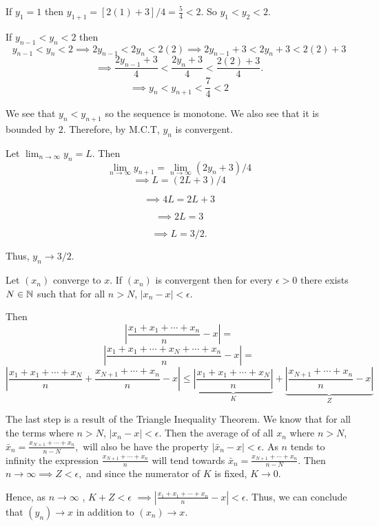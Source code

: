\documentclass{report}
\begin{document}
\begin{myproof}

  If $y_1 = 1$ then $y_{1+1} =  [2(1) +3]/4 = \frac{5}{4} < 2.$ So $y_1 < y_2 < 2.$
    
  If $y_{n-1}<y_n<2$ then $$y_{n-1}<y_{n}<2 \implies 2y_{n-1}<2y_{n}<2(2)\implies 2y_{n-1} + 3<2y_{n} +3 <2(2) +3  $$
 $$ \implies \frac{2y_{n-1} + 3}{4}<\frac{2y_{n} +3}{4} <\frac{2(2) +3}{4}. $$
 $$ \implies y_{n} <y_{n+1} <\frac{7}{4} < 2$$

We see that $y_n < y_{n+1}$ so the sequence is monotone. We also see that it is bounded by $2.$  Therefore, by M.C.T, $y_n$ is convergent.
\par
Let $\lim_{n \rightarrow \infty} y_{n} = L$. Then $$\lim_{n \rightarrow \infty} y_{n+1} = \lim_{n \rightarrow \infty}\left(2 y_n+3\right) / 4$$ 
$$\implies L = \left(2 L+3\right) / 4$$ 

$$\implies 4L = 2 L+3$$ 

$$\implies 2L = 3$$ 

$$\implies L = 3/2.$$ 

Thus, ${y_n} \rightarrow 3/2.$
\end{myproof}
\pagebreak

\bigskip
\begin{myproof}
    
  Let $(x_n)$ converge to $x$. If $(x_n)$ is convergent then for every $\epsilon >0$ there exists $N \in \NN$ such that for all $n > N$, $| x_{n} - x| < \epsilon.$

  Then $$ \left| \frac{x_1 + x_1 +\cdots + x_{n} }{n}  - x\right|= $$$$ \left| \frac{x_1 + x_1 + \cdots + x_{N}+ \cdots + x_{n} }{n}  - x\right|= $$
$$ \left| \frac{x_1 + x_1 + \cdots + x_{N}}{n} + \frac{ x_{N+1}+ \cdots + x_{n} }{n} - x\right| \leq \underbrace{\left| \frac{x_1 + x_1 + \cdots + x_{N}}{n} \right|}_{K}+ \underbrace{ \left|\frac{ x_{N + 1}+ \cdots + x_{n} }{n} - x\right|}_{Z}$$

The last step is a result of the Triangle Inequality Theorem. We know that for all the terms where $n>N$, $| x_{n} - x| < \epsilon.$ Then the average of of all $x_n$ where $n>N$, $ \bar{x}_n =\frac{ x_{N + 1}+ \cdots + x_{n} }{n-N},$ will also be have the property $|\bar{x}_n - x| < \epsilon$.  As $n$ tends to infinity the expression $\frac{ x_{N + 1} + \cdots + x_{n} }{n}$  will tend towards $ \bar{x}_n =\frac{ x_{N + 1}+ \cdots + x_{n} }{n-N}.$ Then $n \rightarrow \infty \implies Z < \epsilon,$ and since the numerator of $K$ is fixed, $K \rightarrow 0.$

Hence, as $n \rightarrow \infty$ , $K + Z <\epsilon$
$  \implies\left| \frac{x_1 + x_1 +\cdots + x_{n} }{n}  - x\right|< \epsilon.$
Thus, we can conclude that $(y_n) \rightarrow x$ in addition to $(x_n) \rightarrow x.$
\bigskip
\end{myproof}
\end{document}
